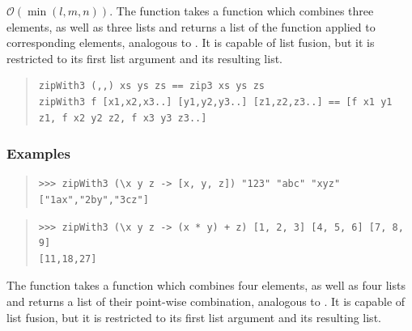 \begin{haddockdesc}
\item[\begin{tabular}{@{}l}
zipWith3 :: (a -> b -> c -> d) -> {\char 91}a{\char 93} -> {\char 91}b{\char 93} -> {\char 91}c{\char 93} -> {\char 91}d{\char 93}
\end{tabular}]
{\haddockbegindoc
\(\mathcal{O}(\min(l,m,n))\). The  function takes a function which combines three
 elements, as well as three lists and returns a list of the function applied
 to corresponding elements, analogous to .
 It is capable of list fusion, but it is restricted to its
 first list argument and its resulting list.\par
\begin{quote}
{\haddockverb\begin{verbatim}
zipWith3 (,,) xs ys zs == zip3 xs ys zs
zipWith3 f [x1,x2,x3..] [y1,y2,y3..] [z1,z2,z3..] == [f x1 y1 z1, f x2 y2 z2, f x3 y3 z3..]\end{verbatim}}
\end{quote}
\subsubsection*{\textbf{Examples}}
\begin{quote}
{\haddockverb\begin{verbatim}
>>> zipWith3 (\x y z -> [x, y, z]) "123" "abc" "xyz"
["1ax","2by","3cz"]

\end{verbatim}}
\end{quote}
\begin{quote}
{\haddockverb\begin{verbatim}
>>> zipWith3 (\x y z -> (x * y) + z) [1, 2, 3] [4, 5, 6] [7, 8, 9]
[11,18,27]

\end{verbatim}}
\end{quote}}
\end{haddockdesc}
\begin{haddockdesc}
\item[\begin{tabular}{@{}l}
zipWith4 :: (a -> b -> c -> d -> e) -> {\char 91}a{\char 93} -> {\char 91}b{\char 93} -> {\char 91}c{\char 93} -> {\char 91}d{\char 93} -> {\char 91}e{\char 93}
\end{tabular}]
{\haddockbegindoc
The  function takes a function which combines four
 elements, as well as four lists and returns a list of their point-wise
 combination, analogous to .
 It is capable of list fusion, but it is restricted to its
 first list argument and its resulting list.\par}
\end{haddockdesc}
